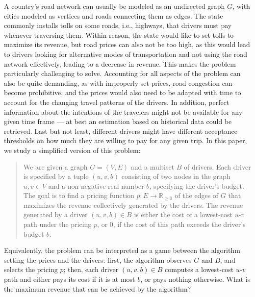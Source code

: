A country's road network can usually be modeled as an undirected graph $G$, with cities modeled as vertices and roads connecting them as edges. The state commonly installs tolls on some roads, i.e., highways, that drivers must pay whenever traversing them. Within reason, the state would like to set tolls to maximize its revenue, but road prices can also not be too high, as this would lead to drivers looking for alternative modes of transportation and not using the road network effectively, leading to a decrease in revenue. This makes the problem particularly challenging to solve. Accounting for all aspects of the problem can also be quite demanding, as with improperly set prices, road congestion can become prohibitive, and the prices would also need to be adapted with time to account for the changing travel patterns of the drivers. In addition, perfect information about the intentions of the travelers might not be available for any given time frame --- at best an estimation based on historical data could be retrieved. Last but not least, different drivers might have different acceptance thresholds on how much they are willing to pay for any given trip. In this paper, we study a simplified version of this problem:

\begin{quote}
    We are given a graph $G = (V, E)$ and a multiset $B$ of drivers. Each driver is specified by a tuple $(u, v, b)$ consisting of two nodes in the graph $u, v \in V$ and a non-negative real number $b$, specifying the driver's budget. The goal is to find a pricing function $p : E \to \mathbb{R}_{\geq 0}$ of the edges of $G$ that maximizes the revenue collectively generated by the drivers. The revenue generated by a driver $(u, v, b) \in B$ is either the cost of a lowest-cost $u$-$v$ path under the pricing $p$, or 0, if the cost of this path exceeds the driver's budget $b$.
\end{quote}

Equivalently, the problem can be interpreted as a game between the algorithm setting the prices and the drivers: first, the algorithm observes $G$ and $B$, and selects the pricing $p$; then, each driver $(u, v, b) \in B$ computes a lowest-cost $u$-$v$ path and either pays its cost if it is at most $b$, or pays nothing otherwise. What is the maximum revenue that can be achieved by the algorithm?

